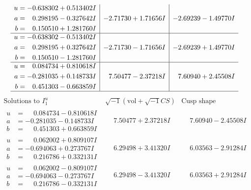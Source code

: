 \documentclass[1p]{elsarticle_modified}
\theoremstyle{definition}
\newcommand{\I}{\sqrt{-1}}
\begin{document}
$$\begin{array}{c|c|c}
\begin{aligned}
u &= -0.638302 + 0.513402 I \\
a &= \phantom{-}0.298195 - 0.327642 I \\
b &= \phantom{-}0.150510 + 1.281760 I\end{aligned}
 & -2.71730 + 1.71656 I & -2.69239 - 1.49770 I \\ \hline\begin{aligned}
u &= -0.638302 - 0.513402 I \\
a &= \phantom{-}0.298195 + 0.327642 I \\
b &= \phantom{-}0.150510 - 1.281760 I\end{aligned}
 & -2.71730 - 1.71656 I & -2.69239 + 1.49770 I \\ \hline\begin{aligned}
u &= \phantom{-}0.084734 + 0.810618 I \\
a &= -0.281035 + 0.148733 I \\
b &= \phantom{-}0.451303 - 0.663859 I\end{aligned}
 & \phantom{-}7.50477 - 2.37218 I & \phantom{-}7.60940 + 2.45508 I\\
 \hline 
 \end{array}$$\newpage$$\begin{array}{c|c|c}  
\text{Solutions to }I^u_{1}& \I (\text{vol} + \sqrt{-1}CS) & \text{Cusp shape}\\
 \hline 
\begin{aligned}
u &= \phantom{-}0.084734 - 0.810618 I \\
a &= -0.281035 - 0.148733 I \\
b &= \phantom{-}0.451303 + 0.663859 I\end{aligned}
 & \phantom{-}7.50477 + 2.37218 I & \phantom{-}7.60940 - 2.45508 I \\ \hline\begin{aligned}
u &= \phantom{-}0.062002 + 0.809107 I \\
a &= -0.694063 + 0.273767 I \\
b &= \phantom{-}0.216786 + 0.332131 I\end{aligned}
 & \phantom{-}6.29498 + 3.41320 I & \phantom{-}6.03563 - 2.91284 I \\ \hline\begin{aligned}
u &= \phantom{-}0.062002 - 0.809107 I \\
a &= -0.694063 - 0.273767 I \\
b &= \phantom{-}0.216786 - 0.332131 I\end{aligned}
 & \phantom{-}6.29498 - 3.41320 I & \phantom{-}6.03563 + 2.91284 I \\ \hline\begin{aligned}

\end{aligned}
\end{array}$$
\end{document}
